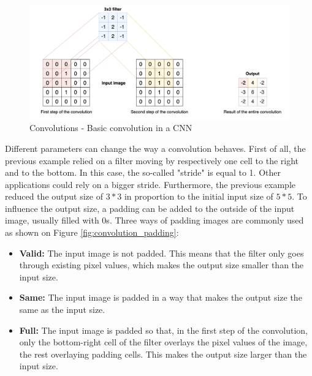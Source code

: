 \begin{figure}[!h]
\centering
\includegraphics[width=1\textwidth, keepaspectratio=true]{./figures/convolution.png}
\caption{Convolutions - Basic convolution in a CNN}
\label{fig:convolution}
\end{figure}
\noindent Different parameters can change the way a convolution behaves. First of all, the previous example relied on a filter moving by respectively one cell to the right and to the bottom. In this case, the so-called "stride" is equal to 1. Other applications could rely on a bigger stride. Furthermore, the previous example reduced the output size of $3*3$ in proportion to the initial input size of $5*5$. To influence the output size, a padding can be added to the outside of the input image, usually filled with 0s. Three ways of padding images are commonly used as shown on Figure \ref{fig:convolution_padding}:
\begin{itemize}
	\item \textbf{Valid:} The input image is not padded. This means that the filter only goes through existing pixel values, which makes the output size smaller than the input size. 
	
	\item \textbf{Same:} The input image is padded in a way that makes the output size the same as the input size.
	
	\item \textbf{Full:} The input image is padded so that, in the first step of the convolution, only the bottom-right cell of the filter overlays the pixel values of the image, the rest overlaying padding cells. This makes the output size larger than the input size. 
\end{itemize}

